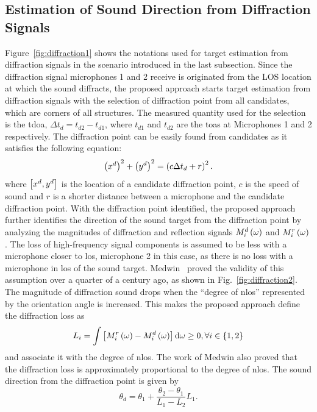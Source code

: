 \documentclass[letterpaper, 10 pt, conference]{ieeeconf}  %
\begin{document}
\subsection{Estimation of Sound Direction from Diffraction Signals} Figure~\ref{fig:diffraction1} shows the notations used for target estimation from diffraction signals in the scenario introduced in the last subsection.  Since the diffraction signal microphones 1 and 2 receive is originated from the LOS location at which the sound diffracts, the proposed approach starts target estimation from diffraction signals with the selection of diffraction point from all candidates, which are corners of all structures.  The measured quantity used for the selection is the \gls{tdoa}, $\Delta t_d = t_{d2} - t_{d1}$, where $t_{d1}$ and $t_{d2}$ are the \glspl{toa} at Microphones 1 and 2 respectively.  The diffraction point can be easily found from candidates as it satisfies the following equation:  
\begin{equation}\label{eq:TDOA1}
\left ( x^d \right )^2 + \left ( y^d \right )^2 = \left ( c \Delta t_d + r \right )^2.  
\end{equation}
where $\left [ x^d, y^d \right ]$ is the location of a candidate diffraction point, $c$ is the speed of sound and $r$ is a shorter distance between a microphone and the candidate diffraction point.  
With the diffraction point identified, the proposed approach further identifies the direction of the sound target from the diffraction point by analyzing the magnitudes of diffraction and reflection signals $M_i^d\left ( \omega \right )$ and $M_i^r\left ( \omega \right )$.  The loss of high-frequency signal components is assumed to be less with a microphone closer to \gls{los}, microphone 2 in this case, as there is no loss with a microphone in \gls{los} of the sound target. Medwin~\cite{medwin1981shadowing} proved the validity of this assumption over a quarter of a century ago, as shown in Fig.~\ref{fig:diffraction2}.  The magnitude of diffraction sound drops when the ``degree of \gls{nlos}'' represented by the orientation angle is increased. This makes the proposed approach define the diffraction loss as
\begin{equation}\label{eq:loss}
L_i = \int \left [ M_i^r\left ( \omega \right ) - M_i^d\left ( \omega \right ) \right ] {\rm d} \omega \geq 0, \forall i \in \left \{ 1,2 \right \}  
\end{equation}
and associate it with the degree of \gls{nlos}.  The work of Medwin also proved that the diffraction loss is approximately proportional to the degree of \gls{nlos}.  The sound direction from the diffraction point is given by
\begin{equation}\label{eq:direction_diffraction}
\theta_d = \theta_1 + \frac{\theta_2 - \theta_1}{L_1 - L_2} L_1.   
\end{equation}
\end{document}

